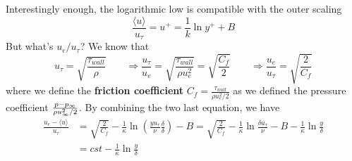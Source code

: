 		Interestingly enough, the logarithmic low is compatible with the outer scaling 
		\begin{equation}
			\frac{\langle u \rangle }{u_\tau} = u^+ = \frac{1}{k}\ln y^+ + B
		\end{equation}
		But what's $u_e /u_\tau$? We know that 
		\begin{equation}
			u_\tau = \sqrt{\frac{\tau _{wall}}{\rho}} \qquad \Rightarrow \frac{u_\tau}{u_e} = \sqrt{\frac{\tau _{wall}}{\rho u_e^2}} = \sqrt{\frac{C_f}{2}} \qquad \Rightarrow \frac{u_e}{u_\tau} = \sqrt{\frac{2}{C_f}} 
		\end{equation}
		where we define the \textbf{friction coefficient} $C_f = \frac{\tau _{wall}}{\rho u_e^2 /2}$ as we defined the pressure coefficient $\frac{p-p_\infty}{\rho u_\infty ^2 /2}$. By combining the two last equation, we have
		\begin{equation}
		\begin{aligned}
			\frac{u_e - \langle u \rangle}{u_\tau} &= \sqrt{\frac{2}{C_f}} - \frac{1}{\kappa} \ln \left(\frac{yu_\tau}{\nu}\frac{\delta}{\delta}\right) - B = \sqrt{\frac{2}{C_f}} - \frac{1}{\kappa} \ln \frac{\delta u_\tau}{\nu} - B -\frac{1}{\kappa} \ln \frac{y}{\delta}\\
			&= cst -\frac{1}{\kappa} \ln \frac{y}{\delta}
		\end{aligned}		
		\end{equation}

